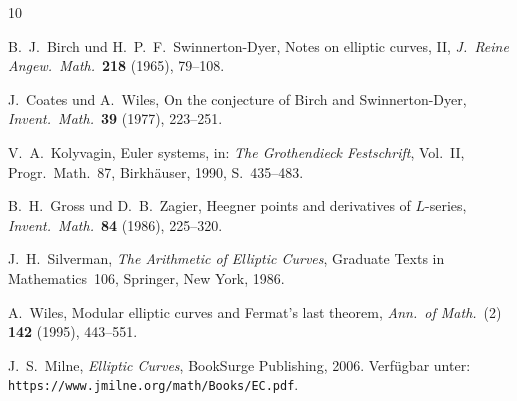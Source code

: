 \documentclass[12pt,a4paper]{amsart}
\theoremstyle{definition}
\begin{document}
\begin{thebibliography}{10}

B.~J.~Birch und H.~P.~F.~Swinnerton-Dyer,
Notes on elliptic curves, II,
\emph{J.\ Reine Angew.\ Math.}\ \textbf{218} (1965), 79--108.

J.~Coates und A.~Wiles,
On the conjecture of Birch and Swinnerton-Dyer,
\emph{Invent.\ Math.}\ \textbf{39} (1977), 223--251.

V.~A.~Kolyvagin,
Euler systems,
in: \emph{The Grothendieck Festschrift}, Vol.~II,
Progr.\ Math.~87, Birkh\"auser, 1990, S.~435--483.

B.~H.~Gross und D.~B.~Zagier,
Heegner points and derivatives of $L$-series,
\emph{Invent.\ Math.}\ \textbf{84} (1986), 225--320.

J.~H.~Silverman,
\emph{The Arithmetic of Elliptic Curves},
Graduate Texts in Mathematics~106,
Springer, New York, 1986.

A.~Wiles,
Modular elliptic curves and Fermat's last theorem,
\emph{Ann.\ of Math.}\ (2) \textbf{142} (1995), 443--551.

J.~S.~Milne,
\emph{Elliptic Curves},
BookSurge Publishing, 2006.
Verf\"ugbar unter: \texttt{https://www.jmilne.org/math/Books/EC.pdf}.

\end{thebibliography}
\end{document}
